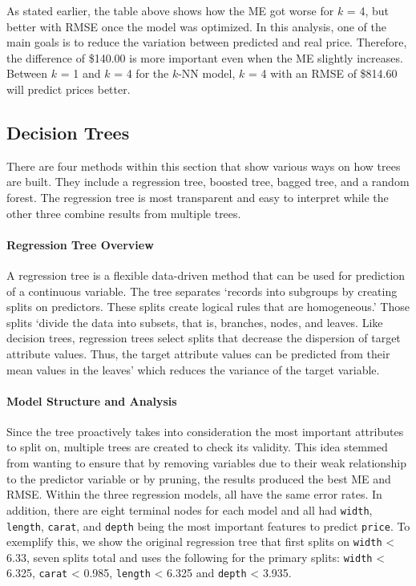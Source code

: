 \documentclass[
  paper=a4,
  ,captions=tableheading
]{scrartcl}
\begin{document}
As stated earlier, the table above shows how the ME got worse for \(k\)
= 4, but better with RMSE once the model was optimized. In this
analysis, one of the main goals is to reduce the variation between
predicted and real price. Therefore, the difference of \$140.00 is more
important even when the ME slightly increases. Between \(k\) = 1 and
\(k\) = 4 for the \(k\)-NN model, \(k\) = 4 with an RMSE of \$814.60
will predict prices better.

\hypertarget{decision-trees}{%
\subsection{Decision Trees}\label{decision-trees}}

There are four methods within this section that show various ways on how
trees are built. They include a regression tree, boosted tree, bagged
tree, and a random forest. The regression tree is most transparent and
easy to interpret while the other three combine results from multiple
trees.

\hypertarget{regression-tree-overview}{%
\paragraph{Regression Tree Overview}\label{regression-tree-overview}}

A regression tree is a flexible data-driven method that can be used for
prediction of a continuous variable. The tree separates `records into
subgroups by creating splits on predictors. These splits create logical
rules that are homogeneous.' Those splits `divide the data into subsets,
that is, branches, nodes, and leaves. Like decision trees, regression
trees select splits that decrease the dispersion of target attribute
values. Thus, the target attribute values can be predicted from their
mean values in the leaves' which reduces the variance of the target
variable.

\hypertarget{model-structure-and-analysis}{%
\paragraph{Model Structure and
Analysis}\label{model-structure-and-analysis}}

Since the tree proactively takes into consideration the most important
attributes to split on, multiple trees are created to check its
validity. This idea stemmed from wanting to ensure that by removing
variables due to their weak relationship to the predictor variable or by
pruning, the results produced the best ME and RMSE. Within the three
regression models, all have the same error rates. In addition, there are
eight terminal nodes for each model and all had \texttt{width},
\texttt{length}, \texttt{carat}, and \texttt{depth} being the most
important features to predict \texttt{price}. To exemplify this, we show
the original regression tree that first splits on \texttt{width}
\textless{} 6.33, seven splits total and uses the following for the
primary splits: \texttt{width} \textless{} 6.325, \texttt{carat}
\textless{} 0.985, \texttt{length} \textless{} 6.325 and \texttt{depth}
\textless{} 3.935.
\end{document}
